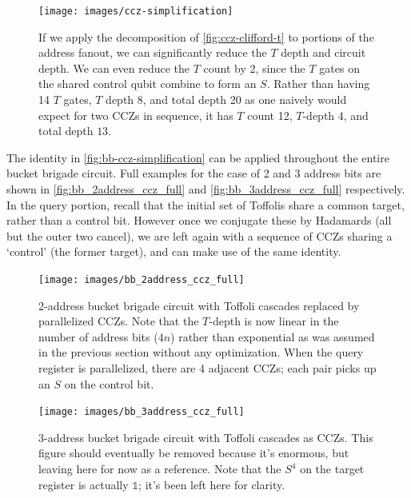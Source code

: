 \documentclass[a4paper,12pt]{article}
\begin{document}
\begin{figure}
 \centering
  \captionsetup{width=.89\linewidth}
 \texttt{[image: images/ccz-simplification]}
 \caption{If we apply the decomposition of \autoref{fig:ccz-clifford-t} to portions of the address fanout, we can significantly reduce the $T$ depth and circuit depth. 
 We can even reduce the $T$ count by 2, since the $T$ gates on the shared control qubit combine to form an $S$.
 Rather than having 14 $T$ gates, $T$ depth 8, and total depth 20 as one naively would expect for two CCZs in sequence, it has $T$ count 12, $T$-depth 4, and total depth $13$.}
 \label{fig:bb-ccz-simplification}
\end{figure}

The identity in \autoref{fig:bb-ccz-simplification} can be applied throughout the entire bucket brigade circuit. 
Full examples for the case of 2 and 3 address bits are shown in \autoref{fig:bb_2address_ccz_full} and \autoref{fig:bb_3address_ccz_full} respectively. 
In the query portion, recall that the initial set of Toffolis share a common target, rather than a control bit.
However once we conjugate these by Hadamards (all but the outer two cancel), we are left again with a sequence of CCZs sharing a `control' (the former target), and can make use of the same identity.

\begin{figure}
 \captionsetup{width=.89\linewidth}
 \texttt{[image: images/bb\_2address\_ccz\_full]}
 \caption{2-address bucket brigade circuit with Toffoli cascades replaced by parallelized CCZs. 
 Note that the $T$-depth is now linear in the number of address bits ($4n$) rather than exponential as was assumed in the previous section without any optimization.
 When the query register is parallelized, there are 4 adjacent CCZs; each pair picks up an $S$ on the control bit.}
 \label{fig:bb_2address_ccz_full}
\end{figure}

\begin{figure}
 \captionsetup{width=.89\linewidth}
 \texttt{[image: images/bb\_3address\_ccz\_full]}
 \caption{3-address bucket brigade circuit with Toffoli cascades as CCZs. 
 This figure should eventually be removed because it's enormous, but leaving here for now as a reference.
 Note that the $S^4$ on the target register is actually $\mathds{1}$; it's been left here for clarity.}
 \label{fig:bb_3address_ccz_full}
\end{figure}
\end{document}
